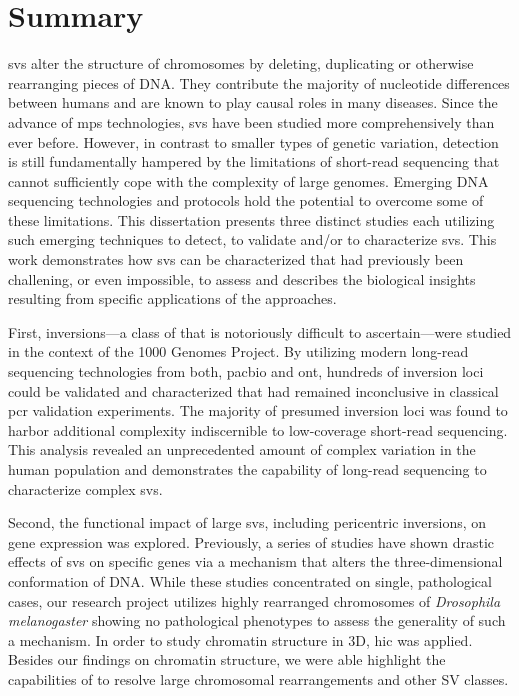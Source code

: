 \cleardoublepage
{}
\chapter*{Summary}

\Acfp{sv} alter the structure of chromosomes by deleting, duplicating or
otherwise rearranging pieces of DNA. They contribute the majority of nucleotide
differences between humans and are known to play causal roles in many diseases.
Since the advance of \acf{mps} technologies, \acp{sv} have been
studied more comprehensively than ever before. However, in contrast to smaller
types of genetic variation, \sv detection is still fundamentally hampered by
the limitations of short-read sequencing that cannot sufficiently cope with the
complexity of large genomes. Emerging DNA sequencing technologies and protocols
hold the potential to overcome some of these limitations. This dissertation
presents three distinct studies each utilizing such emerging techniques to
detect, to validate and/or to characterize \acp{sv}. This work demonstrates
how \acp{sv} can be characterized that had previously been
challening, or even impossible, to assess and describes the biological insights
resulting from specific applications of the approaches.

First, inversions---a class of \sv that is notoriously difficult to
ascertain---were studied in the context of the 1000 Genomes Project. By utilizing
modern long-read sequencing technologies from both, \acl{pacbio} and \acl{ont},
hundreds of inversion loci could be validated and characterized that had remained
inconclusive in classical \acs{pcr} validation experiments. The majority of presumed
inversion loci was found to harbor additional complexity indiscernible to
low-coverage short-read sequencing. This analysis revealed an unprecedented amount of
complex variation in the human population and demonstrates the capability of
long-read sequencing to characterize complex \acp{sv}.

Second, the functional impact of large \acp{sv}, including
pericentric inversions, on gene expression was explored. Previously, a series of
studies have shown drastic effects of \acp{sv} on specific genes via a mechanism that alters
the three-dimensional conformation of DNA. While these studies concentrated on
single, pathological cases, our research project utilizes highly rearranged
chromosomes of \textit{Drosophila melanogaster} showing no pathological
phenotypes to assess the generality of such a mechanism. In order to study
chromatin structure in 3D, \acf{hic} was applied. Besides our findings on
chromatin structure, we were able highlight the capabilities of \hic to resolve
large chromosomal rearrangements and other SV classes.

